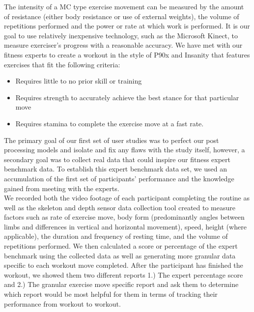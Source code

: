 The intensity of a MC type exercise movement can be measured by the amount of resistance (either body resistance or use of external weights), the volume of repetitions performed and the power or rate at which work is performed. It is our goal to use relatively inexpensive technology, such as the Microsoft Kinect, to measure exerciser’s progress with a reasonable accuracy.
We have met with our fitness experts to create a workout in the style of P90x and Insanity that features exercises that fit the following criteria:
\begin{itemize}
	\item Requires little to no prior skill or training 
	\item Requires strength to accurately achieve the best stance for that particular move
	\item Requires stamina to complete the exercise move at a fast rate.
\end{itemize}
The primary goal of our first set of user studies was to perfect our post processing models and isolate and fix any flaws with the study itself, however, a secondary goal was to collect real data that could inspire our fitness expert benchmark data.  To establish this expert benchmark data set, we used an accumulation of the first set of participants' performance and the knowledge gained from meeting with the experts.  \\
We recorded both the video footage of each participant completing the routine as well as the skeleton and depth sensor data collection tool created to measure factors such as rate of exercise move, body form (predominantly angles between limbs and differences in vertical and horizontal movement), speed, height (where applicable), the duration and frequency of resting time, and the volume of repetitions performed.  We then calculated a score or percentage of the expert benchmark using the collected data as well as generating more granular data specific to each workout move completed.  After the participant has finished the workout, we showed them two different reports 1.) The expert percentage score and 2.) The granular exercise move specific report and ask them to determine which report would be most helpful for them in terms of tracking their performance from workout to workout.